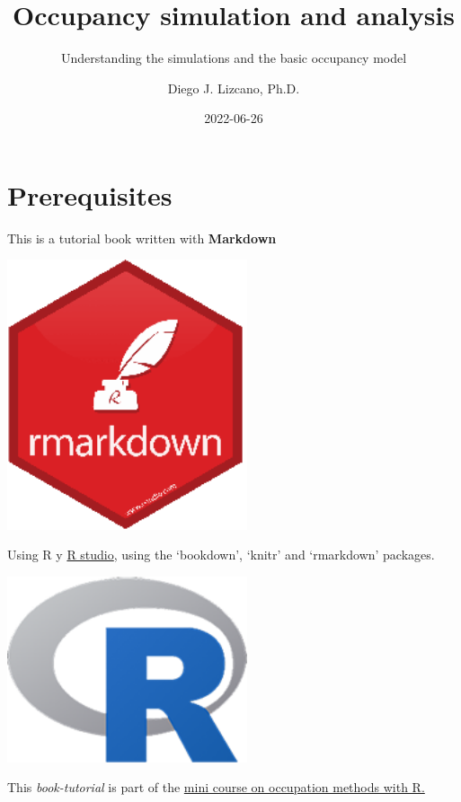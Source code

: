 \documentclass[
]{book}
\title{Occupancy simulation and analysis}
\subtitle{Understanding the simulations and the basic occupancy model}
\author{Diego J. Lizcano, Ph.D.}
\date{2022-06-26}
\begin{document}
\maketitle

{
\hypersetup{linkcolor=}
\setcounter{tocdepth}{1}
\tableofcontents
}
\hypertarget{prerequisites}{%
\chapter{Prerequisites}\label{prerequisites}}

This is a tutorial book written with \textbf{Markdown}

\begin{flushleft}\includegraphics[width=2.78in]{images/rmd} \end{flushleft}

Using R y \href{https://www.rstudio.com/}{R studio}, using the `bookdown', `knitr' and `rmarkdown' packages.

\begin{flushleft}\includegraphics[width=2.78in]{images/R} \end{flushleft}

This \emph{book-tutorial} is part of the \href{http://dlizcano.github.io/OTS}{mini course on occupation methods with R.}
\end{document}
